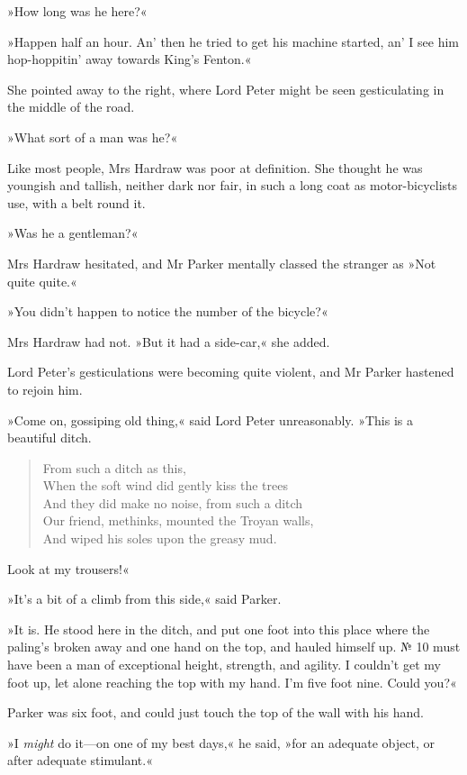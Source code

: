 »How long was he here?«

»Happen half an hour. An' then he tried to get his machine started, an' I see him hop-hoppitin' away towards King's Fenton.«

She pointed away to the right, where Lord Peter might be seen gesticulating in the middle of the road.

»What sort of a man was he?«

Like most people, Mrs Hardraw was poor at definition. She thought he was youngish and tallish, neither dark nor fair, in such a long coat as motor-bicyclists use, with a belt round it.

»Was he a gentleman?«

Mrs Hardraw hesitated, and Mr Parker mentally classed the stranger as »Not quite quite.«

»You didn't happen to notice the number of the bicycle?«

Mrs Hardraw had not. »But it had a side-car,« she added.

Lord Peter's gesticulations were becoming quite violent, and Mr Parker hastened to rejoin him.

»Come on, gossiping old thing,« said Lord Peter unreasonably. »This is a beautiful ditch.

\begin{verse}
From such a ditch as this,\\
When the soft wind did gently kiss the trees\\
And they did make no noise, from such a ditch\\
Our friend, methinks, mounted the Troyan walls,\\
And wiped his soles upon the greasy mud.\\
\end{verse}

Look at my trousers!«

»It's a bit of a climb from this side,« said Parker.

»It is. He stood here in the ditch, and put one foot into this place where the paling's broken away and one hand on the top, and hauled himself up. № 10 must have been a man of exceptional height, strength, and agility. I couldn't get my foot up, let alone reaching the top with my hand. I'm five foot nine. Could you?«

Parker was six foot, and could just touch the top of the wall with his hand.

»I \textit{might} do it—on one of my best days,« he said, »for an adequate object, or after adequate stimulant.«

